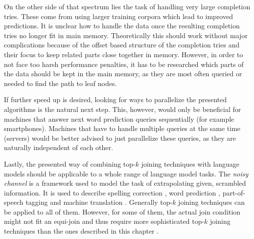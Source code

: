 On the other side of that spectrum lies the task of handling very large
completion tries.
These come from using larger training corpora which lead to improved
predictions.
It is unclear how to handle the data once the resulting completion tries no
longer fit in main memory.
Theoretically this should work without major complications because of the offset
based structure of the completion tries and their focus to keep related parts
close together in memory.
However, in order to not face too harsh performance penalties, it has to
be researched which parts of the data should be kept in the main memory, as they
are most often queried or needed to find the path to leaf nodes.

If further speed up is desired, looking for ways to parallelize the presented
algorithms is the natural next step.
This, however, would only be beneficial for machines that answer next word
prediction queries sequentially (for example smartphones).
Machines that have to handle multiple queries at the same time (servers) would
be better advised to just parallelize these queries, as they are naturally
independent of each other.

Lastly, the presented way of combining top-$k$ joining techniques with language
models should be applicable to a whole range of language model tasks.
The \emph{noisy channel} \parencite{Shannon1948} is a framework used to model
the task of extrapolating given, scrambled information.
It is used to describe spelling correction
\parencite{JurafskyMartin2009,Manning2008,Kernighan1990,Mays1991},
word prediction \parencite{Bickel2005}, part-of-speech tagging
\parencite{Church1988} and machine translation \parencite{Brown1990}.
Generally top-$k$ joining techniques can be applied to all of them.
However, for some of them, the actual join condition might not fit an equi-join
and thus require more sophisticated top-$k$ joining techniques than the ones
described in this chapter \parencite{Ilyas2004}.

